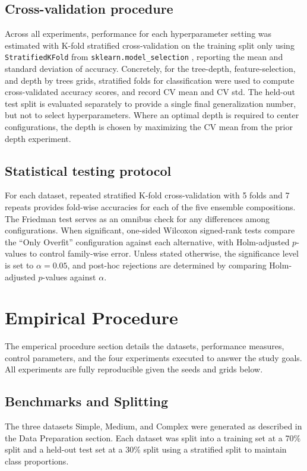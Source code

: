 \documentclass[conference]{IEEEtran}
\begin{document}
\subsection{Cross-validation procedure}
Across all experiments, performance for each hyperparameter setting was estimated with K-fold stratified cross-validation on the training split only using \texttt{StratifiedKFold} from \texttt{sklearn.model\_selection} \cite{scikit-learn}, 
reporting the mean and standard deviation of accuracy. Concretely, for the tree-depth, feature-selection, and depth by trees grids, stratified folds for classification were used to compute cross-validated accuracy scores, and record CV mean and CV std. The held-out test split is evaluated separately to provide a single final generalization number, but not to select hyperparameters. Where an optimal depth is required to center configurations, the depth is chosen by maximizing the CV mean from the prior depth experiment.

\subsection{Statistical testing protocol}
For each dataset, repeated stratified K-fold cross-validation with 5 folds and 7 repeats provides fold-wise accuracies for each of the five ensemble compositions. The Friedman test serves as an omnibus check for any differences among configurations. When significant, one-sided Wilcoxon signed-rank tests compare the ``Only Overfit'' configuration against each alternative, with Holm-adjusted $p$-values to control family-wise error. Unless stated otherwise, the significance level is set to $\alpha=0.05$, and post-hoc rejections are determined by comparing Holm-adjusted $p$-values against $\alpha$.


\section{Empirical Procedure}

The emperical procedure section details the datasets, performance measures, control parameters, and the four experiments executed to answer the study goals. All experiments are fully 
reproducible given the seeds and grids below.

\subsection{Benchmarks and Splitting}
The three datasets Simple, Medium, and Complex were generated as described in the Data Preparation section. Each dataset was split into a training set at a 70\% split and a held-out test set at a 30\% split using a stratified split to maintain class proportions.
\end{document}
